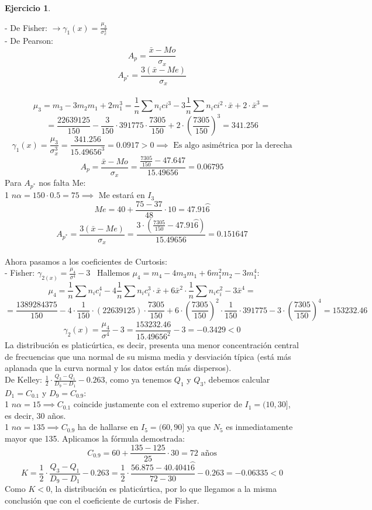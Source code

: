 \documentclass[a4paper, 12pt]{article}
\theoremstyle{definition}
\newtheorem{ej}{Ejercicio}
\begin{document}
\begin{ej}
\begin{enumerate}[label=\textit{\alph*)}]
    - De Fisher: $\rightarrow  \gamma_{1}(x) = \frac{\mu_{3}}{\sigma_{x}^3}$ \\
    - De Pearson: 
    $$A_{p} = \frac{\bar{x}-Mo}{\sigma_{x}}$$
    $$A_{p^*} = \frac{3(\bar{x}-Me)}{\sigma_{x}}$$
    \\
    $$\mu_{3} = m_{3} - 3m_{2}m_{1} + 2m_{1}^3 = \frac{1}{n} \sum n_{i}c{i}^3 - 3\frac{1}{n}\sum n_{i}c{i}^2 \cdot \bar{x} + 2\cdot \bar{x}^3 =$$
    $$= \frac{22639125}{150} - \frac{3}{150} \cdot 391775 \cdot \frac{7305}{150} + 2 \cdot (\frac{7305}{150})^3 = 341.256$$
    $$\gamma_{1}(x) = \frac{\mu_{3}}{\sigma_{x}^3} = \frac{341.256}{15.49656^3}= 0.0917 > 0 \implies \text{ Es algo asimétrica por la derecha}$$
    $$A_{p} = \frac{\bar{x}-Mo}{\sigma_{x}} = \frac{\frac{7305}{150}-47.647}{15.49656} = 0.06795$$
    Para $A_{p^*}$ nos falta Me: \\
    1 $n\alpha = 150 \cdot 0.5 = 75 \implies$ Me estará en $I_{3}$ \\
    $$Me = 40 + \frac{75 - 37}{48}\cdot 10 = 47.91\wideparen{6}$$
    $$A_{p^*} = \frac{3(\bar{x}-Me)}{\sigma_{x}} = \frac{3\cdot(\frac{7305}{150}-47.91\wideparen{6})}{15.49656} = 0.151647$$
    \\
    Ahora pasamos a los coeficientes de Curtosis: \\
    - Fisher: $\gamma_{2(x)} = \frac{\mu_{4}}{\sigma^4}-3$ \ Hallemos $\mu_{4} = m_{4} - 4m_{3}m_{1}+6m_{1}^2m_{2}-3m_{1}^4$: \\
    $$\mu_{4}=\frac{1}{n}\sum n_{i}c_{i}^4-4\frac{1}{n} \sum n_{i}c_{i}^3\cdot \bar{x}+6\bar{x}^2\cdot\frac{1}{n} \sum n_{i}c_{i}^2 - 3\bar{x}^4 = $$
    $$= \frac{1389284375}{150}-4 \cdot\frac{1}{150}\cdot(22639125)\cdot\frac{7305}{150} + 6\cdot(\frac{7305}{150})^2\cdot\frac{1}{150}\cdot 391775 - 3\cdot (\frac{7305}{150})^4 =153232.46$$
    $$\gamma_{2}(x) = \frac{\mu_{4}}{\sigma^4} - 3=\frac{153232.46}{15.49656^2} - 3 = -0.3429 < 0$$
    La distribución es platicúrtica, es decir, presenta una menor concentración central de frecuencias que una normal de su misma media y desviación típica (está más aplanada que la curva normal y los datos están más dispersos). \\
    De Kelley: $\frac{1}{2} \cdot \frac{Q_{3}-Q_{1}}{D_{9}-D_{1}} - 0.263$, como ya tenemos $Q_{1}$ y $Q_{3}$, debemos calcular $D_{1} =  C_{0.1}$ y $D_{9} = C_{0.9}$: \\
    1 $n\alpha = 15 \implies C_{0.1}$ coincide justamente con el extremo superior de $I_{1} = (10,30]$, es decir, 30 años. \\
    1 $n\alpha = 135 \implies C_{0.9}$ ha de hallarse en $I_{5} = (60,90]$ ya que $N_{5}$ es inmediatamente mayor que 135. Aplicamos la fórmula demostrada: \\
    $$C_{0.9} = 60 + \frac{135 -125}{25}\cdot30 = 72 \text{ años}$$
    $$K = \frac{1}{2} \cdot \frac{Q_{3}-Q_{1}}{D_{9}-D_{1}} - 0.263 = \frac{1}{2} \cdot \frac{56.875-40.4041\wideparen{6}}{72-30} - 0.263 = -0.06335 < 0$$
    Como $K<0$, la distribución es platicúrtica, por lo que llegamos a la misma conclusión que con el coeficiente de curtosis de Fisher.
\end{enumerate}
\end{ej}
\end{document}
